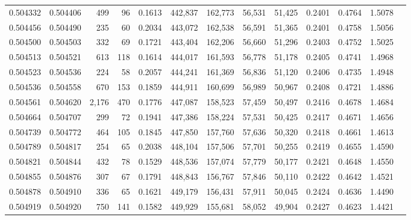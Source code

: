 \begin{tabular}{rrrrrrrrrrrrr}
0.504332 & 0.504406 &   499 &    96 &                                     0.1613 & 442,837 & 162,773 &  56,531 &  51,425 & 0.2401 & 0.4764 & 1.5078 \\
0.504456 & 0.504490 &   235 &    60 &                                     0.2034 & 443,072 & 162,538 &  56,591 &  51,365 & 0.2401 & 0.4758 & 1.5056 \\
0.504500 & 0.504503 &   332 &    69 &                                     0.1721 & 443,404 & 162,206 &  56,660 &  51,296 & 0.2403 & 0.4752 & 1.5025 \\
0.504513 & 0.504521 &   613 &   118 &                                     0.1614 & 444,017 & 161,593 &  56,778 &  51,178 & 0.2405 & 0.4741 & 1.4968 \\
0.504523 & 0.504536 &   224 &    58 &                                     0.2057 & 444,241 & 161,369 &  56,836 &  51,120 & 0.2406 & 0.4735 & 1.4948 \\
0.504536 & 0.504558 &   670 &   153 &                                     0.1859 & 444,911 & 160,699 &  56,989 &  50,967 & 0.2408 & 0.4721 & 1.4886 \\
0.504561 & 0.504620 & 2,176 &   470 &                                     0.1776 & 447,087 & 158,523 &  57,459 &  50,497 & 0.2416 & 0.4678 & 1.4684 \\
0.504664 & 0.504707 &   299 &    72 &                                     0.1941 & 447,386 & 158,224 &  57,531 &  50,425 & 0.2417 & 0.4671 & 1.4656 \\
0.504739 & 0.504772 &   464 &   105 &                                     0.1845 & 447,850 & 157,760 &  57,636 &  50,320 & 0.2418 & 0.4661 & 1.4613 \\
0.504789 & 0.504817 &   254 &    65 &                                     0.2038 & 448,104 & 157,506 &  57,701 &  50,255 & 0.2419 & 0.4655 & 1.4590 \\
0.504821 & 0.504844 &   432 &    78 &                                     0.1529 & 448,536 & 157,074 &  57,779 &  50,177 & 0.2421 & 0.4648 & 1.4550 \\
0.504855 & 0.504876 &   307 &    67 &                                     0.1791 & 448,843 & 156,767 &  57,846 &  50,110 & 0.2422 & 0.4642 & 1.4521 \\
0.504878 & 0.504910 &   336 &    65 &                                     0.1621 & 449,179 & 156,431 &  57,911 &  50,045 & 0.2424 & 0.4636 & 1.4490 \\
0.504919 & 0.504920 &   750 &   141 &                                     0.1582 & 449,929 & 155,681 &  58,052 &  49,904 & 0.2427 & 0.4623 & 1.4421 \\

\end{tabular}
